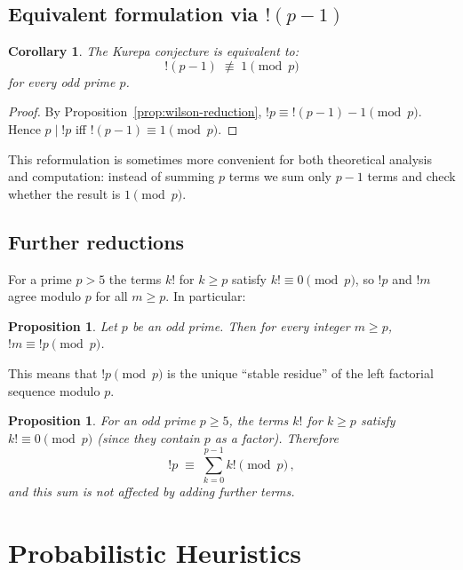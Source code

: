 \documentclass[12pt,a4paper]{amsart}
\newtheorem{corollary}[theorem]{Corollary}
\newtheorem{proposition}[theorem]{Proposition}
\theoremstyle{definition}
\begin{document}
\subsection{Equivalent formulation via $!(p-1)$}

\begin{corollary}\label{cor:equiv}
The Kurepa conjecture is equivalent to:
\[
  !(p-1) \;\not\equiv\; 1 \pmod{p}
\]
for every odd prime $p$.
\end{corollary}
\begin{proof}
By Proposition~\ref{prop:wilson-reduction},
$!p \equiv !(p-1) - 1 \pmod p$.
Hence $p \mid !p$ iff $!(p-1) \equiv 1 \pmod p$.
\end{proof}

This reformulation is sometimes more convenient for both theoretical analysis
and computation: instead of summing $p$ terms we sum only $p-1$ terms and
check whether the result is $1 \pmod p$.

\subsection{Further reductions}

For a prime $p > 5$ the terms $k!$ for $k \geq p$ satisfy $k! \equiv 0
\pmod p$, so $!p$ and $!m$ agree modulo $p$ for all $m \geq p$.
In particular:

\begin{proposition}
Let $p$ be an odd prime. Then for every integer $m \geq p$,
$!m \equiv !p \pmod p$.
\end{proposition}

This means that $!p \pmod p$ is the unique ``stable residue'' of the left
factorial sequence modulo $p$.

\begin{proposition}\label{prop:last-terms}
For an odd prime $p \geq 5$, the terms $k!$ for $k \geq p$ satisfy
$k! \equiv 0 \pmod p$ (since they contain $p$ as a factor).
Therefore
\[
  !p \;\equiv\; \sum_{k=0}^{p-1} k! \pmod p\,,
\]
and this sum is not affected by adding further terms.
\end{proposition}

\section{Probabilistic Heuristics}
\label{sec:heuristics}
\end{document}

